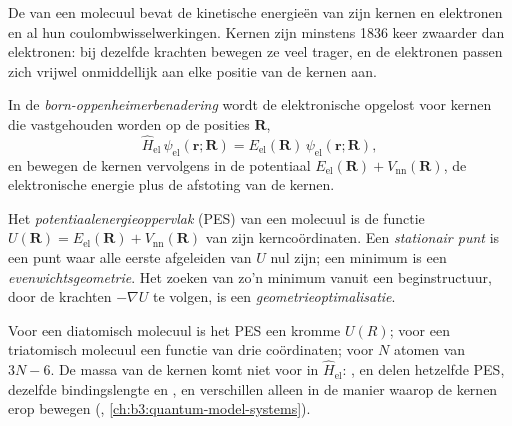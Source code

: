 De  van een molecuul bevat de kinetische energieën van
zijn kernen en elektronen en al hun coulombwisselwerkingen. Kernen zijn
minstens 1836 keer zwaarder dan elektronen: bij dezelfde krachten
bewegen ze veel trager, en de elektronen passen zich vrijwel onmiddellijk
aan elke positie van de kernen aan.

\begin{definition}\label{def:b3:computational-chemistry:born-oppenheimer}
In de \emph{born-oppenheimerbenadering}
wordt de elektronische  opgelost voor kernen die
vastgehouden worden op de posities $\mathbf R$,
\[
\hat H_{\mathrm{el}}\,\psi_{\mathrm{el}}(\mathbf r;\mathbf R) =
E_{\mathrm{el}}(\mathbf R)\,\psi_{\mathrm{el}}(\mathbf r;\mathbf R),
\]
en bewegen de kernen vervolgens in de potentiaal $E_{\mathrm{el}}(\mathbf R) +
V_{\mathrm{nn}}(\mathbf R)$, de elektronische energie plus de afstoting
van de kernen.
\end{definition}

\begin{definition}\label{def:b3:computational-chemistry:pes}
Het \emph{potentiaalenergieoppervlak} (PES) van
een molecuul is de functie $U(\mathbf R) = E_{\mathrm{el}}(\mathbf R) +
V_{\mathrm{nn}}(\mathbf R)$ van zijn kerncoördinaten. Een \emph{stationair
punt} is een punt waar alle eerste afgeleiden van $U$
nul zijn; een minimum is een
\emph{evenwichtsgeometrie}. Het zoeken van zo'n
minimum vanuit een beginstructuur, door de
krachten $-\nabla U$ te volgen, is een
\emph{geometrieoptimalisatie}.
\end{definition}

Voor een diatomisch molecuul is het PES een kromme $U(R)$; voor een
triatomisch molecuul een functie van drie coördinaten; voor $N$ atomen van
$3N - 6$. De massa van de
kernen komt niet voor in $\hat H_{\mathrm{el}}$: ,  en  delen
hetzelfde PES, dezelfde bindingslengte en , en verschillen
alleen in de manier waarop de kernen erop bewegen (,
\cref{ch:b3:quantum-model-systems}).

